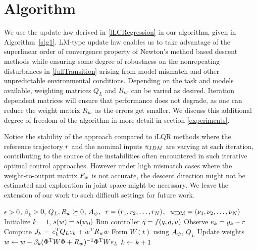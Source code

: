 \section{Algorithm}\label{algorithm}

We use the update law derived in \eqref{ILCRegression} in our algorithm, given in Algorithm~\ref{alg1}. LM-type update law enables us to take advantage of the superlinear order of convergence property of Newton's method based descent methods while ensuring some degree of robustness on the nonrepeating disturbances in \eqref{fullTransition} arising from model mismatch and other unpredictable environmental conditions. Depending on the task and models available, weighting matrices $Q_L$ and $R_w$ can be varied as desired. Iteration dependent matrices will ensure that performance does not degrade, as one can reduce the weight matrix $R_w$ as the errors get smaller. We discuss this additional degree of freedom of the algorithm in more detail in section \ref{experiments}.


Notice the stability of the approach compared to iLQR methods where the reference trajectory $r$ and the nominal inputs $u_{IDM}$ are varying at each iteration, contributing to the source of the instabilities often encountered in such iterative optimal control approaches. However under high mismatch cases where the weight-to-output matrix $F_w$ is not accurate, the descent direction might not be estimated and exploration in joint space might be necessary. We leave the extension of our work to such difficult settings for future work.

\begin{algorithm}[tb]
   \caption{\alg}
   \label{alg1}
\begin{algorithmic}
    $\epsilon > 0$, $\beta_k > 0$, $Q_L, R_{w} \succeq 0$, $A_{\psi}$, $\ \traj = (\traj_1, \traj_2, \ldots, \traj_N)$, $\ u_{\mathrm{IDM}} = (\nu_1, \nu_2, \ldots, \nu_N)$
   \STATE Initialize $k = 1$, $s(w) = s(w_0)$
   \REPEAT 
 	   \STATE Run controller $\ddot{q} = f(q,\dot{q},u)$ %
 	   \STATE Observe $e_k = y_k - r$
 	   \STATE Compute $J_k$ = $e_k^{\mathrm{T}}Q_Le_k + w^{\mathrm{T}}R_ww$
 	   \STATE Form $W(t)$ using $A_{\psi}$, $Q_L$
 	   \STATE Update weights $w \leftarrow w - \beta_k(\Phi^{\mathrm{T}}W\Phi + R_{w})^{-1}\Phi^{\mathrm{T}}We_L$
 	   \STATE $k \leftarrow k + 1$
\end{algorithmic}
\end{algorithm}